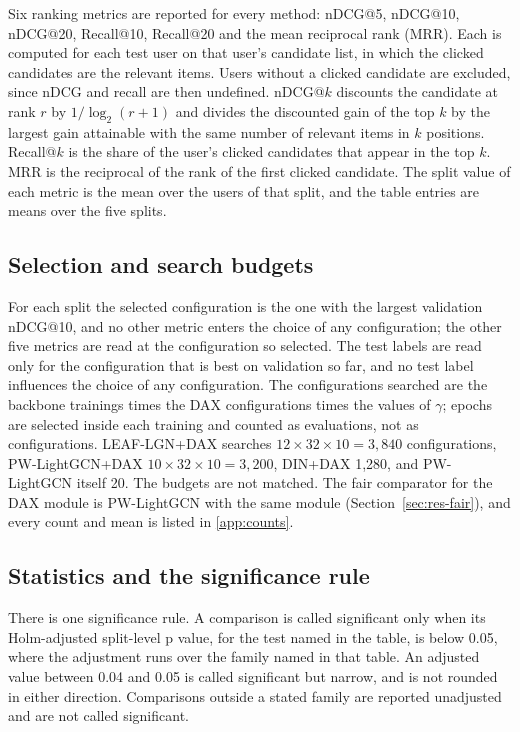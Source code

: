 Six ranking metrics are reported for every method: nDCG@5, nDCG@10, nDCG@20, Recall@10, Recall@20 and the mean reciprocal rank (MRR). Each is
computed for each test user on that user's candidate list, in which the clicked candidates are the relevant items. Users without a clicked
candidate are excluded, since nDCG and recall are then undefined. nDCG@$k$ discounts the candidate at rank $r$ by $1/\log_2(r+1)$ and divides the
discounted gain of the top $k$ by the largest gain attainable with the same number of relevant items in $k$ positions. Recall@$k$ is the share of
the user's clicked candidates that appear in the top $k$. MRR is the reciprocal of the rank of the first clicked candidate. The split value of each
metric is the mean over the users of that split, and the table entries are means over the five splits.

\subsection{Selection and search budgets}
\label{sec:protocol-selection}

For each split the selected configuration is the one with the largest validation nDCG@10, and no other metric enters the choice of any
configuration; the other five metrics are read at the configuration so selected. The test labels are read only for the configuration
that is best on validation so far, and no test label influences the choice of any configuration. The configurations searched are the backbone
trainings times the DAX configurations times the values of $\gamma$; epochs are selected inside each training and counted as evaluations, not
as configurations. LEAF-LGN+DAX searches $12\times32\times10=3{,}840$ configurations, PW-LightGCN+DAX $10\times32\times10=3{,}200$, DIN+DAX 1,280,
and PW-LightGCN itself 20. The budgets are not matched. The fair comparator for the DAX module is PW-LightGCN with the same module
(Section~\ref{sec:res-fair}), and every count and mean is listed in \ref{app:counts}.

\subsection{Statistics and the significance rule}
\label{sec:protocol-stats}

There is one significance rule. A comparison is called significant only when its Holm-adjusted split-level p value, for the test named in the
table, is below 0.05, where the adjustment runs over the family named in that table. An adjusted value between 0.04 and 0.05 is called
significant but narrow, and is not rounded in either direction. Comparisons outside a stated family are reported unadjusted and are not called
significant.

